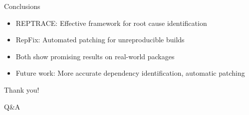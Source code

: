 \documentclass{beamer}
\begin{document}
\begin{frame}{Conclusions}
\begin{itemize}
\item REPTRACE: Effective framework for root cause identification
\item RepFix: Automated patching for unreproducible builds
\item Both show promising results on real-world packages
\item Future work: More accurate dependency identification, automatic patching
\end{itemize}
\end{frame}

\begin{frame}
\centering
\Huge{Thank you!}
\par
\vspace{1cm}
\large{Q\&A}
\end{frame}
\end{document}
